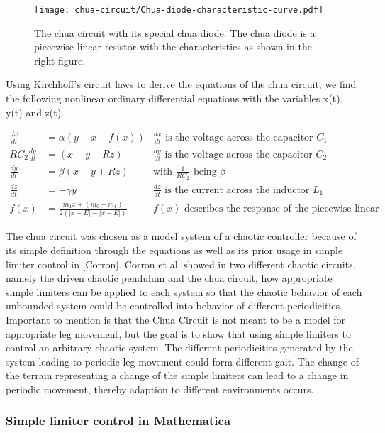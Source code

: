 \documentclass[main]{subfiles}
\begin{document}
\begin{figure}[H]
\centering

\texttt{[image: chua-circuit/Chua-diode-characteristic-curve.pdf]}
\caption[The chua circuit]{The chua circuit with its special chua diode. The chua diode is a piecewise-linear resistor with the characteristics as shown in the right figure.}
\label{figure:chuacircuit}
\end{figure}

Using Kirchhoff's circuit laws to derive the equations of the chua circuit, we find the following nonlinear ordinary differential equations with the variables x(t), y(t) and z(t).

\begin{align*}
\frac{dx}{dt}&=\alpha (y-x-f(x)) &\frac{dx}{dt}\text{ is the voltage across the capacitor }C_1\\
RC_2\frac{dy}{dt}&= (x-y+Rz) &\frac{dy}{dt}\text{ is the voltage across the capacitor }C_2\\
\frac{dy}{dt}&=\beta (x-y+Rz) &\text{with } \frac{1}{RC_2} \text{ being }\beta\\
\frac{dz}{dt}&=-\gamma y &\frac{dz}{dt}\text{ is the current across the inductor }L_1\\
f (x) &= \frac{m_1 x + (m_0 - m_1)}{2 (| x + E | -| x - E |)} &f(x)\text{ describes the response of the piecewise linear resistor}
\end{align*}

The chua circuit was chosen as a model system of a chaotic controller because of its simple definition through the equations as well as its prior usage in simple limiter control in [Corron]. Corron et al. showed in two different chaotic circuits, namely the driven chaotic pendulum and the chua circuit, how appropriate simple limiters can be applied to each system so that the chaotic behavior of each unbounded system could be controlled into behavior of different periodicities. Important to mention is that the Chua Circuit is not meant to be a model for appropriate leg movement, but the goal is to show that using simple limiters to control an arbitrary chaotic system. The different periodicities generated by the system leading to periodic leg movement could form different gait. The change of the terrain representing a change of the simple limiters can lead to a change in periodic movement, thereby adaption to different environments occurs. 

\subsubsection{Simple limiter control in Mathematica}
\end{document}
